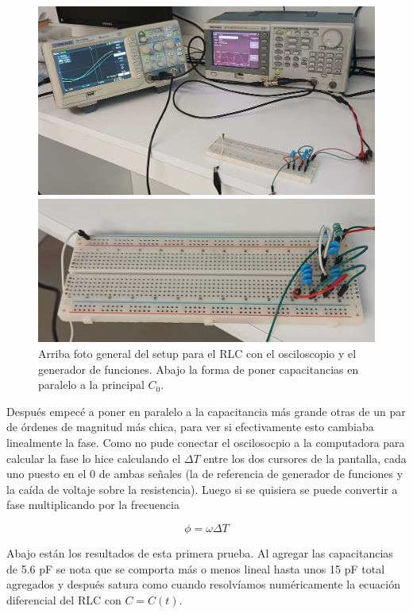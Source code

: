 \begin{figure}[!ht]
	\centering
	\includegraphics[width=0.675\linewidth]{Figures/28_04_2025/20250430_162448.JPG}
	
	\vspace{5.01mm}
	
	\includegraphics[width=0.675\linewidth]{Figures/28_04_2025/20250430_160622.JPG}
	\caption{Arriba foto general del setup para el RLC con el osciloscopio y el generador de funciones. Abajo la forma de poner capacitancias en paralelo a la principal $C_0$.}
	\label{fig:fotos_28_05_2025}
\end{figure}

Después empecé a poner en paralelo a la capacitancia más grande otras de un par de órdenes de magnitud más chica, para ver si efectivamente esto cambiaba linealmente la fase. Como no pude conectar el oscilosocpio a la computadora para calcular la fase lo hice calculando el $\Delta T$ entre los dos cursores de la pantalla, cada uno puesto en el 0 de ambas señales (la de referencia de generador de funciones y la caída de voltaje sobre la resistencia). Luego si se quisiera se puede convertir a fase multiplicando por la frecuencia 

\begin{equation}
	\phi = \omega \Delta T %
\end{equation}	

Abajo están los resultados de esta primera prueba. Al agregar las capacitancias de 5.6 pF se nota que se comporta más o menos lineal hasta unos 15 pF total agregados y después satura como cuando resolvíamos numéricamente la ecuación diferencial del RLC con $C=C(t)$.


